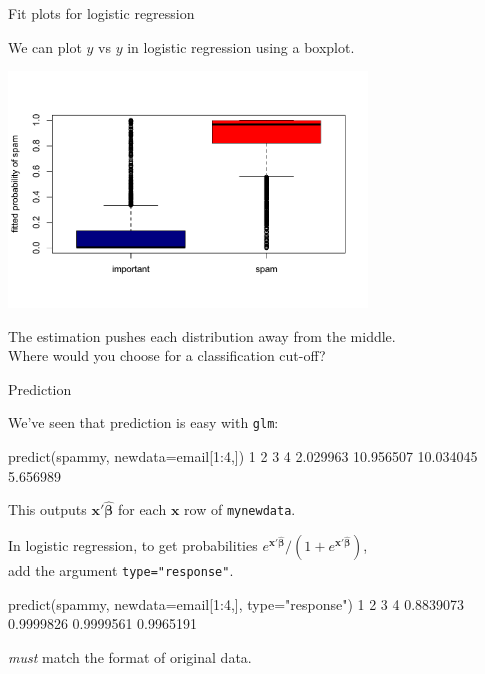 \documentclass[11pt,xcolor=svgnames]{beamer}
\newcommand{\gr}{\color{gray}}
\newcommand{\br}{\color{SaddleBrown}}
\newcommand{\nv}{\color{Navy}}
\newcommand{\bs}[1]{\boldsymbol{#1}}
\newcommand{\bm}[1]{\mathbf{#1}}
\newcommand{\sk}{\vspace{.5cm}}
\begin{document}
\begin{frame}
{Fit plots for logistic regression}

{We can plot $\hat y$ vs $y$ in logistic regression using a boxplot.}

\begin{center}
\includegraphics[width=3.75in]{spamfit}
\end{center}

{The estimation pushes each distribution away from the middle.}\\
\gr Where would you choose for a classification cut-off?
\end{frame}



\begin{frame}[fragile]
{Prediction}

{We've seen that prediction is easy with {\tt glm}:}
\begin{semiverbatim}\small \nv\vspace{-.5cm}
predict(spammy, newdata=email[1:4,])\br
      1          2         3         4 
2.029963 10.956507 10.034045  5.656989 
 \end{semiverbatim}
This outputs $\bm{x}'\bs{\hat\beta}$ for each $\bm{x}$ row of {\tt mynewdata}.

\sk
In logistic regression, to get { probabilities} $e^{\bm{x}'\bs{\hat\beta}}/(1+e^{\bm{x}'\bs{\hat\beta}})$,\\ add the argument 
{ \tt type="response"}.
\begin{semiverbatim}\small \nv\vspace{-.5cm}
predict(spammy, newdata=email[1:4,], type="response")\br
        1         2         3         4 
0.8839073 0.9999826 0.9999561 0.9965191
\end{semiverbatim}


{\gr {\tt newdata} {\it must} match the format of original data.}

\end{frame}
\end{document}
